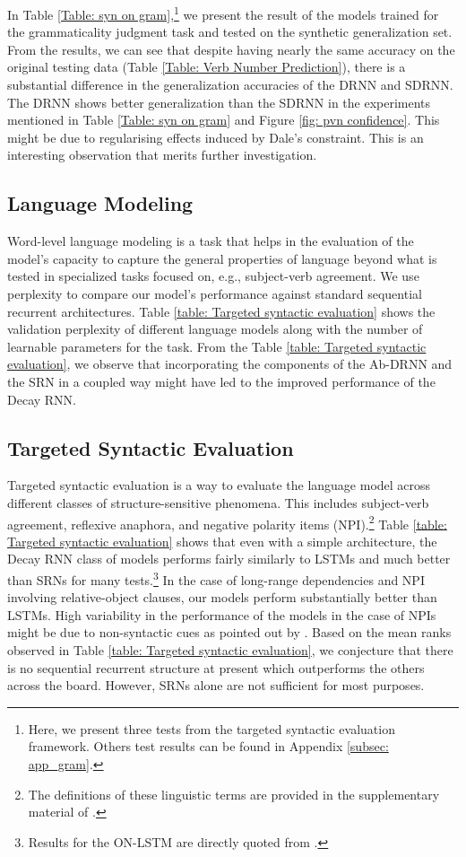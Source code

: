 \documentclass[11pt,a4paper]{article}
\begin{document}
In Table \ref{Table: syn on gram},\footnote{Here, we present three tests from the targeted syntactic evaluation framework. Others test results can be found in Appendix \ref{subsec: app_gram}.} we present the result of the models trained for the grammaticality judgment task and tested on the synthetic generalization set. From the results, we can see that despite having nearly the same accuracy on the original testing data (Table \ref{Table: Verb Number Prediction}), there is a substantial difference in the generalization accuracies of the DRNN and SDRNN. The DRNN shows better generalization than the SDRNN in the experiments mentioned in Table \ref{Table: syn on gram} and Figure \ref{fig: pvn confidence}. This might be due to regularising effects induced by Dale's constraint. This is an interesting observation that merits further investigation.  

\subsection{Language Modeling}
\label{subsec:Language Modeling}
Word-level language modeling is a task that helps in the evaluation of the model's capacity to capture the general properties of language beyond what is tested in specialized tasks focused on, e.g., subject-verb agreement. We use perplexity to compare our model's performance against standard sequential recurrent architectures. Table \ref{table: Targeted syntactic evaluation} shows the validation perplexity of different language models along with the number of learnable parameters for the task. From the Table \ref{table: Targeted syntactic evaluation}, we observe that incorporating the components of the Ab-DRNN and the SRN in a coupled way might have led to the improved performance of the Decay RNN.


\subsection{Targeted Syntactic Evaluation}
\label{subsec: Targeted Syntactic Evaluation}
Targeted syntactic evaluation \cite{marvin2018targeted} is a way to evaluate the language model across different classes of structure-sensitive phenomena. This includes subject-verb agreement, reflexive anaphora, and negative polarity items (NPI).\footnote{The definitions of these linguistic terms are provided in the supplementary material of \citet{marvin2018targeted}.}
Table \ref{table: Targeted syntactic evaluation} shows that even with a simple architecture, the Decay RNN class of models performs fairly similarly to LSTMs and much better than SRNs for many tests.\footnote{Results for the ON-LSTM are directly quoted from \citet{shen2018ordered}.} In the case of long-range dependencies and NPI involving relative-object clauses, our models perform substantially better than LSTMs. High variability in the performance of the models in the case of NPIs might be due to non-syntactic cues as pointed out by \citet{marvin2018targeted}. Based on the mean ranks observed in Table \ref{table: Targeted syntactic evaluation}, we conjecture that there is no sequential recurrent structure at present which outperforms the others across the board. However, SRNs alone are not sufficient for most purposes.  
\end{document}
